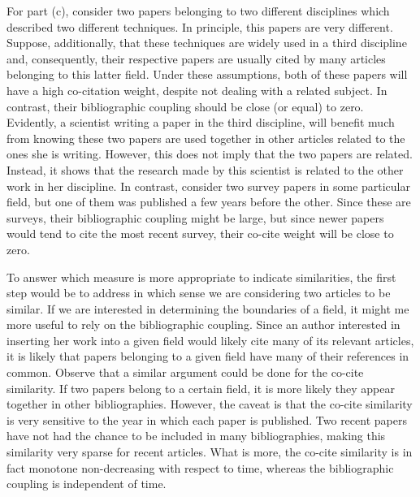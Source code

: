 \documentclass[11pt, english]{article}
\begin{document}
\begin{multicols}{2}
For part (c), consider two papers belonging to two different disciplines which described two different techniques. In principle, this papers are very different. Suppose, additionally, that these techniques are widely used in a third discipline and, consequently, their respective papers are usually cited by many articles belonging to this latter field. Under these assumptions, both of these papers will have a high co-citation weight, despite not dealing with a related subject. In contrast, their bibliographic coupling should be close (or equal) to zero. Evidently, a scientist writing a paper in the third discipline, will benefit much from knowing these two papers are used together in other articles related to the ones she is writing. However, this does not imply that the two papers are related. Instead, it shows that the research made by this scientist is related to the other work in her discipline. In contrast, consider two survey papers in some particular field, but one of them was published a few years before the other. Since these are surveys, their bibliographic coupling might be large, but since newer papers would tend to cite the most recent survey, their co-cite weight will be close to zero.

To answer which measure is more appropriate to indicate similarities, the first step would be to address in which sense we are considering two articles to be similar. If we are interested in determining the boundaries of a field, it might me more useful to rely on the bibliographic coupling. Since an author interested in inserting her work into a given field would likely cite many of its relevant articles, it is likely that papers belonging to a given field have many of their references in common. Observe that a similar argument could be done for the co-cite similarity. If two papers belong to a certain field, it is more likely they appear together in other bibliographies. However, the caveat is that the co-cite similarity is very sensitive to the year in which each paper is published. Two recent papers have not had the chance to be included in many bibliographies, making this similarity very sparse for recent articles. What is more, the co-cite similarity is in fact monotone non-decreasing with respect to time, whereas the bibliographic coupling is independent of time.


\end{multicols}
\end{document}
